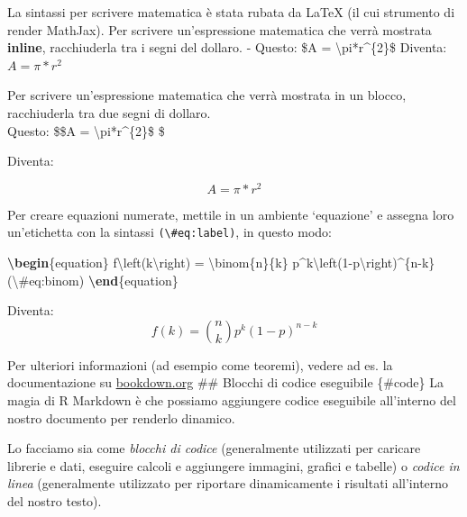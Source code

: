 \documentclass[a4paper, 11pt, nobind]{templates/ociamthesis}
\newenvironment{Shaded}{\begin{snugshade}}{\end{snugshade}}
\newcommand{\ExtensionTok}[1]{#1}
\newcommand{\KeywordTok}[1]{\textcolor[rgb]{0.13,0.29,0.53}{\textbf{#1}}}
\newcommand{\NormalTok}[1]{#1}
\newcommand{\SpecialCharTok}[1]{\textcolor[rgb]{0.00,0.00,0.00}{#1}}
\newcommand{\SpecialStringTok}[1]{\textcolor[rgb]{0.31,0.60,0.02}{#1}}
\renewenvironment{Shaded}
{
  \vspace{10pt}%
  \begin{snugshade}%
}{%
  \end{snugshade}%
  \vspace{8pt}%
}
\begin{document}
La sintassi per scrivere matematica è stata rubata da LaTeX (il cui strumento di render MathJax). Per scrivere un'espressione matematica che verrà mostrata \textbf{inline}, racchiuderla tra i segni del dollaro.
- Questo: \$A = \textbackslash pi*r\^{}\{2\}\$ Diventa: \(A = \pi*r^{2}\)

Per scrivere un'espressione matematica che verrà mostrata in un blocco, racchiuderla tra due segni di dollaro.\\

Questo: \$\$A = \textbackslash pi*r\^{}\{2\}\$ \$

Diventa:

\[A = \pi*r^{2}\]

Per creare equazioni numerate, mettile in un ambiente `equazione' e assegna loro un'etichetta con la sintassi \texttt{(\textbackslash{}\#eq:label)}, in questo modo:

\begin{Shaded}
\begin{Highlighting}[]
\KeywordTok{\textbackslash{}begin}\NormalTok{\{}\ExtensionTok{equation}\NormalTok{\}}\SpecialStringTok{ }
\SpecialStringTok{  f}\SpecialCharTok{\textbackslash{}left}\SpecialStringTok{(k}\SpecialCharTok{\textbackslash{}right}\SpecialStringTok{) = }\SpecialCharTok{\textbackslash{}binom}\SpecialStringTok{\{n\}\{k\} p\^{}k}\SpecialCharTok{\textbackslash{}left}\SpecialStringTok{(1{-}p}\SpecialCharTok{\textbackslash{}right}\SpecialStringTok{)\^{}\{n{-}k\}}
\SpecialStringTok{  (}\SpecialCharTok{\textbackslash{}\#}\SpecialStringTok{eq:binom)}
\KeywordTok{\textbackslash{}end}\NormalTok{\{}\ExtensionTok{equation}\NormalTok{\} }
\end{Highlighting}
\end{Shaded}

Diventa:
\begin{equation}
f\left(k\right)=\binom{n}{k}p^k\left(1-p\right)^{n-k}
\label{eq:binom}
\end{equation}

Per ulteriori informazioni (ad esempio come teoremi), vedere ad es. la documentazione su \href{https://bookdown.org/yihui/bookdown/markdown-extensions-by-bookdown.html\#equations}{bookdown.org}
\#\# Blocchi di codice eseguibile \{\#code\}
La magia di R Markdown è che possiamo aggiungere codice eseguibile all'interno del nostro documento per renderlo dinamico.

Lo facciamo sia come \emph{blocchi di codice} (generalmente utilizzati per caricare librerie e dati, eseguire calcoli e aggiungere immagini, grafici e tabelle) o \emph{codice in linea} (generalmente utilizzato per riportare dinamicamente i risultati all'interno del nostro testo).
\end{document}
